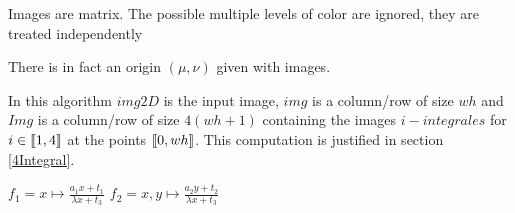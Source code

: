 


Images are matrix. The possible multiple levels of color are ignored, they are treated independently

There is in fact an origin $(\mu,\nu)$ given with images.



In this algorithm $img2D$ is the input image, $img$ is a column/row of size $wh$ and $Img$ is a column/row of size $4(wh+1)$ containing the images $i-integrales$ for $i\in \llbracket 1,4 \rrbracket $ at the points $\llbracket 0,wh \rrbracket$. This computation is justified in section \ref{4Integral}.



\begin{algorithm}[H]
\caption{$applyHomography(img,imgf,H)$}
$f_1 = x\mapsto \frac{a_1x + t_1}{\lambda x + t_3}$ \;
$f_2 = x,y\mapsto \frac{a_2y + t_2}{\lambda x + t_3}$ \;

\end{algorithm}


